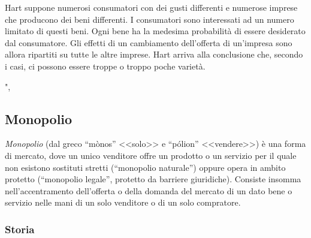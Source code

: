 Hart
suppone numerosi consumatori con dei gusti differenti e numerose imprese che 
producono dei beni differenti. I consumatori sono interessati ad un numero 
limitato di questi beni. Ogni bene ha la medesima probabilità di essere 
desiderato dal consumatore. Gli effetti di un cambiamento dell'offerta di 
un'impresa sono allora ripartiti su tutte le altre imprese. Hart arriva alla 
conclusione che, secondo i casi, ci possono essere troppe o troppo poche 
varietà.

% 
% 
% 
", %
% 
% 

\subsection{Monopolio}

\emph{Monopolio} (dal greco ``mònos'' <<solo>> 
e  ``pólion''  <<vendere>>) è una forma di 
mercato, dove un unico venditore offre un prodotto 
o un servizio per il quale non esistono sostituti stretti (``monopolio 
naturale'') oppure opera in ambito protetto (``monopolio legale'', protetto da 
barriere giuridiche).
Consiste insomma 
nell'accentramento dell'offerta o della domanda del 
mercato di un dato bene o servizio nelle mani di un solo 
venditore o di un solo compratore.

\subsubsection{Storia}


